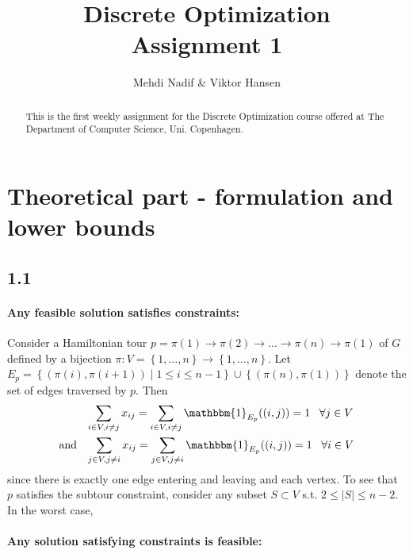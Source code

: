 \documentclass[12pt]{article}
\begin{document}
\nocite{*}


\title{Discrete Optimization \\
       Assignment 1}

\author{Mehdi Nadif \& Viktor Hansen}

\maketitle

\begin{abstract}
  This is the first weekly assignment for the Discrete Optimization course offered at The Department of Computer Science, Uni. Copenhagen.
\end{abstract}

\pagebreak

\section*{Theoretical part - formulation and lower bounds}
\subsection*{1.1}
\paragraph{Any feasible solution satisfies constraints:} Consider a Hamiltonian tour $p = \pi(1) \rightarrow \pi(2) \rightarrow \hdots \rightarrow \pi(n) \rightarrow \pi(1)$ of $G$ defined by a bijection $\pi : V=\left\{ 1, \hdots, n \right\} \rightarrow \left\{ 1, \hdots, n \right\}$. Let $E_p = \left\{ \left(\pi(i),\pi(i+1) \right) \; | \; 1 \leq i \leq n-1 \right\} \cup \left\{ \left(\pi(n),\pi(1) \right) \right\}$ denote the set of edges traversed by $p$. Then
\begin{align*}
&\sum_{i \in V, i \neq j} x_{ij} = \sum_{i \in V, i \neq j} \mathbbm{1}_{E_p}((i,j)) = 1 \; \; \; \forall j \in V \\
\mathrm{and} \; \; \;  &\sum_{j \in V, j \neq i} x_{ij} = \sum_{j \in V, j \neq i} \mathbbm{1}_{E_p}((i,j)) = 1 \; \; \; \forall i \in V
\end{align*}
since there is exactly one edge entering and leaving and each vertex. To see that $p$ satisfies the subtour constraint, consider any subset $S \subset V$ s.t. $2 \leq |S| \leq n-2$. In the worst case, 

\paragraph{Any solution satisfying constraints is feasible:}
\end{document}
